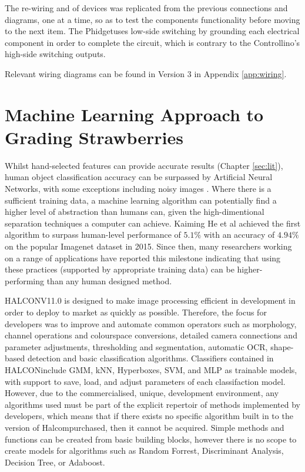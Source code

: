 \documentclass[fleqn,twoside,12pt]{report}
\begin{document}
The re-wiring and of devices was replicated from the previous connections and diagrams, one at a time, so as to test the components functionality before moving to the next item. The Phidget\texttrademark uses low-side switching by grounding each electrical component in order to complete the circuit, which is contrary to the Controllino\texttrademark's high-side switching outputs. 

Relevant wiring diagrams can be found in Version 3 in Appendix \ref{app:wiring}.




\newpage

\chapter{Machine Learning Approach to Grading Strawberries}
\label{sec:IV}


Whilst hand-selected features can provide accurate results (Chapter \ref{sec:lit}), human object classification accuracy can be surpassed by Artificial Neural Networks, with some exceptions including noisy images \cite{dodge}. Where there is a sufficient training data, a machine learning algorithm can potentially find a higher level of abstraction than humans can, given the high-dimentional separation techniques a computer can achieve. Kaiming He et al \cite{he2} achieved the first algorithm to surpass human-level performance of $5.1\%$ with an accuracy of $4.94\%$ on the popular Imagenet dataset in 2015. Since then, many researchers working on a range of applications have reported this milestone \cite{geirhos, saon, xiong, han} indicating that using these practices (supported by appropriate training data) can be higher-performing than any human designed method. 

HALCON\texttrademark V11.0 is designed to make image processing efficient in development in order to deploy to market as quickly as possible. Therefore, the focus for developers was to improve and automate common operators such as morphology, channel operations and colourspace conversions, detailed camera connections and parameter adjustments, thresholding and segmentation, automatic OCR, shape-based detection and basic classification algorithms. Classifiers contained in HALCON\texttrademark include GMM, kNN, Hyperboxes, SVM, and MLP as trainable models, with support to save, load, and adjust parameters of each classifaction model. However, due to the commercialised, unique, development environment, any algorithms used must be part of the explicit repertoir of methods implemented by developers, which means that if there exists no specific algorithm built in to the version of Halcom\texttrademark purchased, then it cannot be acquired. Simple methods and functions can be created from basic building blocks, however there is no scope to create models for algorithms such as Random Forrest, Discriminant Analysis, Decision Tree, or Adaboost. 
\end{document}
